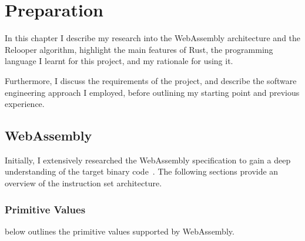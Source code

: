 \documentclass[00-main.tex]{subfiles}
\begin{document}
\chapter{Preparation}

In this chapter I describe my research into the WebAssembly architecture and the Relooper algorithm, highlight the main features of Rust, the programming language I learnt for this project, and my rationale for using it.

Furthermore, I discuss the requirements of the project, and describe the software engineering approach I employed, before outlining my starting point and previous experience.

\section{WebAssembly}

Initially, I extensively researched the WebAssembly specification to gain a deep understanding of the target binary code~.
The following sections provide an overview of the instruction set architecture.

\subsection{Primitive Values}

 below outlines the primitive values supported by WebAssembly.

\begin{table}[t]
  \addtolength{\belowcaptionskip}{\medskipamount}
  \centering
  \caption{Summary of the primitive types supported by WebAssembly. The `constructor' is the name of the type in code and in the specification.}
  \label{tab:wasm value types} %
\end{table}
\end{document}
